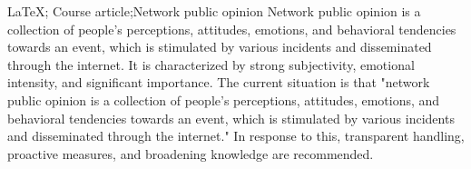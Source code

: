\makecover

\begin{abstract}{\LaTeX; ; 课程论文; 网络舆情}
    网络舆情是由于各种事件的刺激而产生的、通过互联网传播的、人们对于该事件的所有认知、态度、情感和行为倾向的集合。它具有片面性强、情绪化强、十分重要的特点。目前的现状是：“网络舆情是由于各种事件的刺激而产生的、通过互联网传播的、人们对于该事件的所有认知、态度、情感和行为倾向的集合”。对此应当采取透明处理、积极应对、拓宽知识面等方案。
\end{abstract}


\begin{abstractEng}{\LaTeX; Course article;Network public opinion }
    Network public opinion is a collection of people's perceptions, attitudes, emotions, and behavioral tendencies towards an event, which is stimulated by various incidents and disseminated through the internet. It is characterized by strong subjectivity, emotional intensity, and significant importance. The current situation is that "network public opinion is a collection of people's perceptions, attitudes, emotions, and behavioral tendencies towards an event, which is stimulated by various incidents and disseminated through the internet." In response to this, transparent handling, proactive measures, and broadening knowledge are recommended.
\end{abstractEng}


\tableofcontents